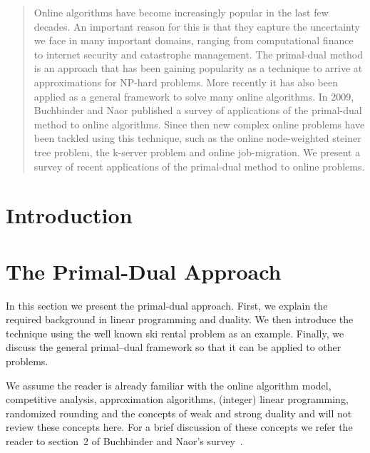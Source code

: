 \documentclass[10pt, twocolumn]{article}
\begin{document}
\maketitle

\begin{abstract}
Online algorithms have become increasingly popular in the last few decades.
An important reason for this is that they capture the uncertainty we face in many important domains, ranging from computational finance to internet security and catastrophe management.
The primal-dual method is an approach that has been gaining popularity as a technique to arrive at approximations for NP-hard problems.
More recently it has also been applied as a general framework to solve many online algorithms.
In 2009, Buchbinder and Naor published a survey of applications of the primal-dual method to online algorithms.
Since then new complex online problems have been tackled using this technique, such as the online node-weighted steiner tree problem, the k-server problem and online job-migration.
We present a survey of recent applications of the primal-dual method to online problems.
\end{abstract}

\section{Introduction}
\label{intro}




\section{The Primal-Dual Approach}
\label{primal-dual}

In this section we present the primal-dual approach.
First, we explain the required background in linear programming and duality.
We then introduce the technique using the well known ski rental problem as an example.
Finally, we discuss the general primal--dual framework so that it can be applied to other problems.

We assume the reader is already familiar with the online algorithm model, competitive analysis, approximation algorithms, (integer) linear programming, randomized rounding and the concepts of weak and strong duality and will not review these concepts here.
For a brief discussion of these concepts we refer the reader to section~2 of Buchbinder and Naor's survey~\cite{buchbinder09:survey}.



\end{document}
